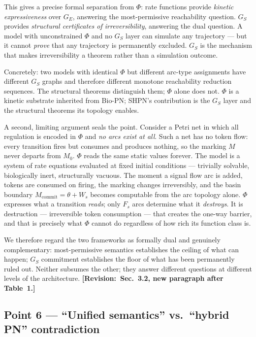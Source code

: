 \documentclass[11pt,letterpaper]{article}
\newcommand{\sref}[1]{\textbf{[Revision:~#1]}}
\begin{document}
This gives a precise formal separation from $\Phi$: rate functions provide
\emph{kinetic expressiveness} over $G_E$, answering the most-permissive
reachability question. $G_S$ provides \emph{structural certificates of
irreversibility}, answering the dual question. A model with unconstrained $\Phi$
and no $G_S$ layer can simulate any trajectory --- but it cannot \emph{prove}
that any trajectory is permanently excluded. $G_S$ is the mechanism that makes
irreversibility a theorem rather than a simulation outcome.

Concretely: two models with identical $\Phi$ but different arc-type assignments
have different $G_S$ graphs and therefore different monotone reachability
reduction sequences. The structural theorems distinguish them; $\Phi$ alone
does not. $\Phi$ is a kinetic substrate inherited from Bio-PN; SHPN's
contribution is the $G_S$ layer and the structural theorems its topology
enables.

A second, limiting argument seals the point. Consider a Petri net in which all
regulation is encoded in $\Phi$ and \emph{no arcs exist at all}. Such a net has
no token flow: every transition fires but consumes and produces nothing, so the
marking $M$ never departs from $M_0$. $\Phi$ reads the same static values
forever. The model is a system of rate equations evaluated at fixed initial
conditions --- trivially solvable, biologically inert, structurally vacuous.
The moment a signal flow arc is added, tokens are consumed on firing, the
marking changes irreversibly, and the basin boundary $M_{\text{commit}} =
\theta + W_s$ becomes computable from the arc topology alone. $\Phi$ expresses
what a transition \emph{reads}; only $F_s$ arcs determine what it
\emph{destroys}. It is destruction --- irreversible token consumption ---
that creates the one-way barrier, and that is precisely what $\Phi$ cannot
do regardless of how rich its function class is.

We therefore regard the two frameworks as formally dual and genuinely
complementary: most-permissive semantics establishes the ceiling of what can
happen; $G_S$ commitment establishes the floor of what has been permanently
ruled out. Neither subsumes the other; they answer different questions at
different levels of the architecture.
\sref{Sec.~3.2, new paragraph after Table~1.}

\subsection*{Point 6 --- ``Unified semantics'' vs.\ ``hybrid PN'' contradiction}
\end{document}
